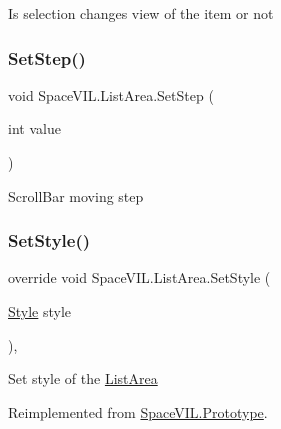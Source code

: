 Is selection changes view of the item or not 

\mbox{\label{class_space_v_i_l_1_1_list_area_a4092a62f4f548a9289632a91cd8d452a}} 
\subsubsection{\texorpdfstring{Set\+Step()}{SetStep()}}
{\footnotesize\ttfamily void Space\+V\+I\+L.\+List\+Area.\+Set\+Step (\begin{DoxyParamCaption}\item[{int}]{value }\end{DoxyParamCaption})\hspace{0.3cm}{\ttfamily [inline]}}



Scroll\+Bar moving step 

\mbox{\label{class_space_v_i_l_1_1_list_area_a04902026e7956980b7dce5bff22d082c}} 
\subsubsection{\texorpdfstring{Set\+Style()}{SetStyle()}}
{\footnotesize\ttfamily override void Space\+V\+I\+L.\+List\+Area.\+Set\+Style (\begin{DoxyParamCaption}\item[{\mbox{\hyperlink{class_space_v_i_l_1_1_decorations_1_1_style}{Style}}}]{style }\end{DoxyParamCaption})\hspace{0.3cm}{\ttfamily [inline]}, {\ttfamily [virtual]}}



Set style of the \mbox{\hyperlink{class_space_v_i_l_1_1_list_area}{List\+Area}} 



Reimplemented from \mbox{\hyperlink{class_space_v_i_l_1_1_prototype_ae96644a6ace490afb376fb542161e541}{Space\+V\+I\+L.\+Prototype}}.

\mbox{\label{class_space_v_i_l_1_1_list_area_a0c0974eca2621188c88ba752a5f62a1a}} 
